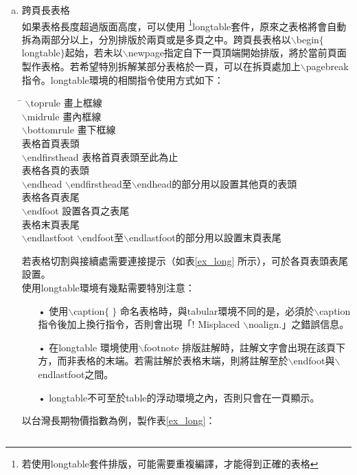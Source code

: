 \begin{enumerate}[a.)]
	
	\item 跨頁長表格 \\
	如果表格長度超過版面高度，可以使用 \footnote{若使用longtable套件排版，可能需要重複編譯，才能得到正確的表格}longtable套件，原來之表格將會自動拆為兩部分以上，分別排版於兩頁或是多頁之中。跨頁長表格以$\backslash$begin$\{$longtable$\}$起始，若未以$\backslash$newpage指定自下一頁頂端開始排版，將於當前頁面製作表格。若希望特別拆解某部分表格於一頁，可以在拆頁處加上$\backslash$pagebreak 指令。longtable環境的相關指令使用方式如下：
		\begin{tabbing}
 		\hspace{10em} \= \hspace{5em} \kill
 		$\backslash$toprule  \>  畫上框線 \\	
		$\backslash$midrule \>  畫內框線 \\
		$\backslash$bottomrule \> 畫下框線  \\
			表格首頁表頭 \> 	\\
		$\backslash$endfirsthead \> 表格首頁表頭至此為止 \\
			表格各頁的表頭 \>  \\
		$\backslash$endhead\> $\backslash$endfirsthead至$\backslash$endhead的部分用以設置其他頁的表頭 \\
			表格各頁表尾	\> \\
		$\backslash$endfoot		\>	設置各頁之表尾 \\		
			表格末頁表尾			 \>  \\
		$\backslash$endlastfoot \>  $\backslash$endfoot至$\backslash$endlastfoot的部分用以設置末頁表尾	
 		\end{tabbing}	
 		若表格切割與接續處需要連接提示（如表\ref{ex_long} 所示），可於各頁表頭表尾設置。\\
 		使用longtable環境有幾點需要特別注意：
 			\begin{itemize}
			\item[•] 使用$\backslash$caption$\{\;\}$  命名表格時，與tabular環境不同的是，必須於$\backslash$caption指令後加上換行指令，否則會出現「! Misplaced $\backslash$noalign.」之錯誤信息。
			\item[•] 在longtable 環境使用$\backslash$footnote 排版註解時，註解文字會出現在該頁下方，而非表格的末端。若需註解於表格末端，則將註解至於$\backslash$endfoot與$\backslash$endlastfoot之間。
			\item[•] longtable不可至於table的浮动環境之內，否則只會在一頁顯示。
 			\end{itemize}
	 以台灣長期物價指數為例，製作表\ref{ex_long}：
		\begin{longtable}{@{}lrrrrr@{}}

\end{longtable}
\end{enumerate}
